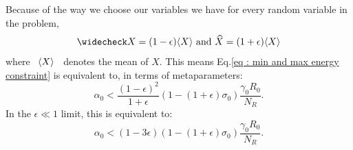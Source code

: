 \documentclass[12pt, titlepage]{report}
\begin{document}
Because of the way we choose our variables we have for every random variable in the problem,
\begin{equation}
\mind{X} = (1-\epsilon)\mean{X} \text{ and }\maxd{X} = (1+\epsilon)\mean{X}
\end{equation}
where \ $\langle X \rangle$ \ denotes the mean of $X$. This means Eq.\eqref{eq : min and max energy constraint} is equivalent to, in terms of metaparameters:
\begin{equation}
  \alpha_0 < \frac{\left(1-\epsilon\right)^2}{1+\epsilon}\left(1-\left(1+\epsilon\right)\sigma_0\right)\frac{\gamma_0 R_0}{N_R}.
\end{equation}
In the $\epsilon \ll 1$ limit, this is equivalent to:
\begin{equation}
  \alpha_0 < \left(1-3\epsilon\right)\left(1-(1+\epsilon)\sigma_0\right)\frac{\gamma_0 R_0}{N_R}.
\end{equation}
\end{document}
